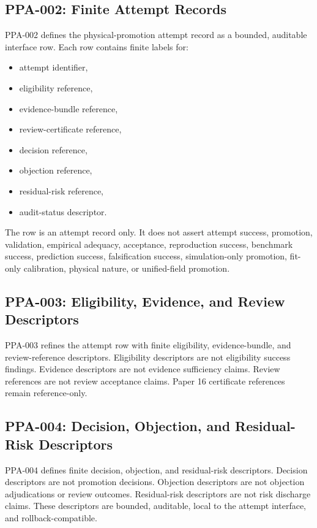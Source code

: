\documentclass{article}
\begin{document}
\subsection{PPA-002: Finite Attempt Records}

PPA-002 defines the physical-promotion attempt record as a bounded,
auditable interface row. Each row contains finite labels for:
\begin{itemize}
\item attempt identifier,
\item eligibility reference,
\item evidence-bundle reference,
\item review-certificate reference,
\item decision reference,
\item objection reference,
\item residual-risk reference,
\item audit-status descriptor.
\end{itemize}
The row is an attempt record only. It does not assert attempt success,
promotion, validation, empirical adequacy, acceptance, reproduction success,
benchmark success, prediction success, falsification success, simulation-only
promotion, fit-only calibration, physical nature, or unified-field promotion.

\subsection{PPA-003: Eligibility, Evidence, and Review Descriptors}

PPA-003 refines the attempt row with finite eligibility, evidence-bundle, and
review-reference descriptors. Eligibility descriptors are not eligibility
success findings. Evidence descriptors are not evidence sufficiency claims.
Review references are not review acceptance claims. Paper 16 certificate
references remain reference-only.

\subsection{PPA-004: Decision, Objection, and Residual-Risk Descriptors}

PPA-004 defines finite decision, objection, and residual-risk descriptors.
Decision descriptors are not promotion decisions. Objection descriptors are
not objection adjudications or review outcomes. Residual-risk descriptors are
not risk discharge claims. These descriptors are bounded, auditable, local to
the attempt interface, and rollback-compatible.
\end{document}
